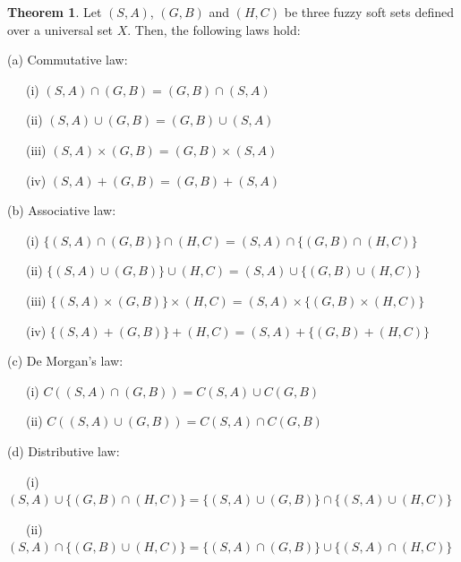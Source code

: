 \documentclass{article}
\theoremstyle{definition}
\newtheorem{theorem}{Theorem}[section]
\begin{document}
\begin{theorem}
    Let $(S,A)$, $(G,B)$ and $(H,C)$ be three fuzzy soft sets defined over a universal set $X$. Then, the following laws hold:

(a) Commutative law:

    ~~~(i) $(S,A) \cap (G,B) = (G,B) \cap (S,A)$

    ~~~(ii) $(S,A) \cup (G,B) = (G,B) \cup (S,A)$

    ~~~(iii) $(S,A) \times (G,B) = (G,B) \times (S,A)$

    ~~~(iv) $(S,A) + (G,B) = (G,B) + (S,A)$

    (b) Associative law:

    ~~~(i) $\{(S,A) \cap (G,B)\}\cap (H,C) = (S,A) \cap \{(G,B)\cap (H,C)\}$

    ~~~(ii) $\{(S,A) \cup (G,B)\}\cup (H,C) = (S,A) \cup \{(G,B)\cup (H,C)\}$

    ~~~(iii) $\{(S,A) \times (G,B)\} \times (H,C) = (S,A) \times \{(G,B) \times (H,C)\}$

    ~~~(iv) $\{(S,A) + (G,B)\} + (H,C) = (S,A) + \{(G,B) + (H,C)\}$

    (c) De Morgan's law:

    ~~~(i) $C((S,A) \cap (G,B)) = C(S,A) \cup C(G,B)$

    ~~~(ii) $C((S,A) \cup (G,B)) = C(S,A) \cap C(G,B)$

    (d) Distributive law:

    ~~~(i) $(S,A)\cup \{(G,B) \cap (H,C)\} = \{(S,A) \cup (G, B)\} \cap \{(S,A) \cup (H,C)\}$

    ~~~(ii) $(S,A)\cap \{(G,B) \cup (H,C)\} = \{(S,A) \cap (G,B)\} \cup \{(S,A) \cap (H,C)\}$

\end{theorem}
\end{document}
